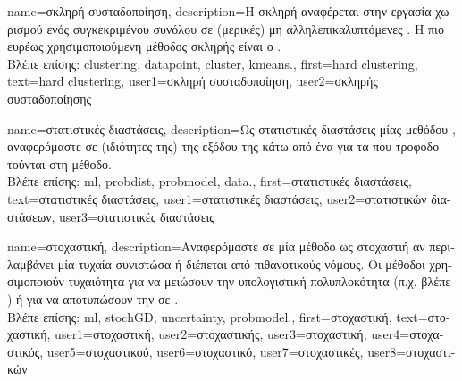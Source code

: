 {name={\foreignlanguage{greek}{σκληρή συσταδοποίηση}}, 
	description={\foreignlanguage{greek}{Η σκληρή} 
		\foreignlanguage{greek}{αναφέρεται στην εργασία χωρισμού ενός συγκεκριμένου συνόλου}  
		\foreignlanguage{greek}{σε (μερικές) μη αλληλεπικαλυπτόμενες} . 
		\foreignlanguage{greek}{Η πιο ευρέως χρησιμοποιούμενη μέθοδος σκληρής}  \foreignlanguage{greek}{είναι ο} 
		.\\
		\foreignlanguage{greek}{Βλέπε επίσης:} \gls{clustering}, \gls{datapoint}, \gls{cluster}, \gls{kmeans}.},
	first={hard clustering},
	text={hard clustering},
	user1={\foreignlanguage{greek}{σκληρή συσταδοποίηση}}, %
	user2={\foreignlanguage{greek}{σκληρής συσταδοποίησης}} %
}

{name={\foreignlanguage{greek}{στατιστικές διαστάσεις}}, 
	description={\foreignlanguage{greek}{Ως στατιστικές διαστάσεις μίας μεθόδου} 
		, \foreignlanguage{greek}{αναφερόμαστε σε (ιδιότητες της)}  \foreignlanguage{greek}{της 
		εξόδου της κάτω από ένα}  \foreignlanguage{greek}{για τα}  
		\foreignlanguage{greek}{που τροφοδοτούνται στη μέθοδο.} \\
		\foreignlanguage{greek}{Βλέπε επίσης:} \gls{ml}, \gls{probdist}, \gls{probmodel}, \gls{data}.},
	first={\foreignlanguage{greek}{στατιστικές διαστάσεις}},
	text={\foreignlanguage{greek}{στατιστικές διαστάσεις}},
	user1={\foreignlanguage{greek}{στατιστικές διαστάσεις}}, %
	user2={\foreignlanguage{greek}{στατιστικών διαστάσεων}}, %
	user3={\foreignlanguage{greek}{στατιστικές διαστάσεις}} %
}

{name={\foreignlanguage{greek}{στοχαστική}},
	description={\foreignlanguage{greek}{Αναφερόμαστε σε μία μέθοδο ως στοχαστιή} 
		\foreignlanguage{greek}{αν περιλαμβάνει μία τυχαία συνιστώσα ή διέπεται από πιθανοτικούς 
		νόμους. Οι μέθοδοι}  \foreignlanguage{greek}{χρησιμοποιούν τυχαιότητα για να 
		μειώσουν την υπολογιστική πολυπλοκότητα (π.χ. βλέπε} ) 
		\foreignlanguage{greek}{ή για να αποτυπώσουν την}  
		\foreignlanguage{greek}{σε} . \\
		\foreignlanguage{greek}{Βλέπε επίσης:} \gls{ml}, \gls{stochGD}, \gls{uncertainty}, \gls{probmodel}.},
	first={\foreignlanguage{greek}{στοχαστική}},
	text={\foreignlanguage{greek}{στοχαστική}}, 
	user1={\foreignlanguage{greek}{στοχαστική}}, %
	user2={\foreignlanguage{greek}{στοχαστικής}}, %
	user3={\foreignlanguage{greek}{στοχαστική}}, %
	user4={\foreignlanguage{greek}{στοχαστικός}}, %
	user5={\foreignlanguage{greek}{στοχαστικού}}, %
	user6={\foreignlanguage{greek}{στοχαστικό}}, %
	user7={\foreignlanguage{greek}{στοχαστικές}}, %
	user8={\foreignlanguage{greek}{στοχαστικών}} %
}

